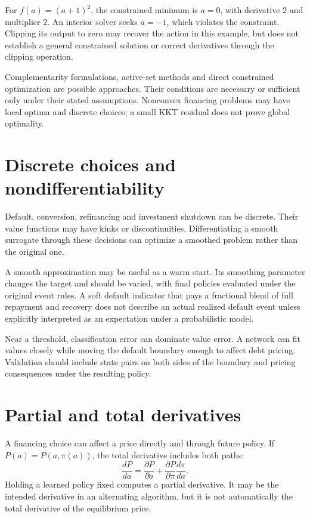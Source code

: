 For $f(a)=(a+1)^2$, the constrained minimum is $a=0$, with derivative 2 and multiplier 2. An interior solver seeks $a=-1$, which violates the constraint. Clipping its output to zero may recover the action in this example, but does not establish a general constrained solution or correct derivatives through the clipping operation.

Complementarity formulations, active-set methods and direct constrained optimization are possible approaches. Their conditions are necessary or sufficient only under their stated assumptions. Nonconvex financing problems may have local optima and discrete choices; a small KKT residual does not prove global optimality.

\section{Discrete choices and nondifferentiability}
Default, conversion, refinancing and investment shutdown can be discrete. Their value functions may have kinks or discontinuities. Differentiating a smooth surrogate through these decisions can optimize a smoothed problem rather than the original one.

A smooth approximation may be useful as a warm start. Its smoothing parameter changes the target and should be varied, with final policies evaluated under the original event rules. A soft default indicator that pays a fractional blend of full repayment and recovery does not describe an actual realized default event unless explicitly interpreted as an expectation under a probabilistic model.

Near a threshold, classification error can dominate value error. A network can fit values closely while moving the default boundary enough to affect debt pricing. Validation should include state pairs on both sides of the boundary and pricing consequences under the resulting policy.

\section{Partial and total derivatives}
A financing choice can affect a price directly and through future policy. If $P(a)=P(a,\pi(a))$, the total derivative includes both paths:
\begin{equation}
 \frac{dP}{da}=\frac{\partial P}{\partial a}+\frac{\partial P}{\partial\pi}\frac{d\pi}{da}.
\end{equation}
Holding a learned policy fixed computes a partial derivative. It may be the intended derivative in an alternating algorithm, but it is not automatically the total derivative of the equilibrium price.

